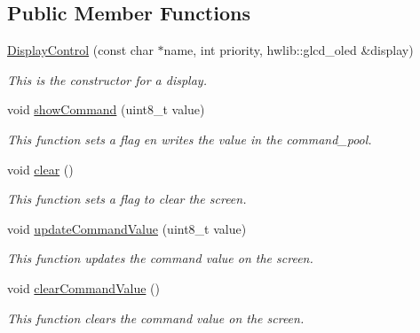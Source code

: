 \subsection*{Public Member Functions}
\begin{DoxyCompactItemize}
\item 
\mbox{\hyperlink{class_display_control_a5a24ccc28d6984bda6871ef6d0e4af3f}{Display\+Control}} (const char $\ast$name, int priority, hwlib\+::glcd\+\_\+oled \&display)
\begin{DoxyCompactList}\small\item\em This is the constructor for a display. \end{DoxyCompactList}\item 
\mbox{\label{class_display_control_a78b3ace358fc199a76e00148115f449d}} 
void \mbox{\hyperlink{class_display_control_a78b3ace358fc199a76e00148115f449d}{show\+Command}} (uint8\+\_\+t value)
\begin{DoxyCompactList}\small\item\em This function sets a flag en writes the value in the command\+\_\+pool. \end{DoxyCompactList}\item 
\mbox{\label{class_display_control_aa231d63d18b09506e0c766999f480579}} 
void \mbox{\hyperlink{class_display_control_aa231d63d18b09506e0c766999f480579}{clear}} ()
\begin{DoxyCompactList}\small\item\em This function sets a flag to clear the screen. \end{DoxyCompactList}\item 
void \mbox{\hyperlink{class_display_control_ae2d8d0f502941d859639fd46ddd8924b}{update\+Command\+Value}} (uint8\+\_\+t value)
\begin{DoxyCompactList}\small\item\em This function updates the command value on the screen. \end{DoxyCompactList}\item 
\mbox{\label{class_display_control_a01207b2034dc3946856496bf2e4d39b6}} 
void \mbox{\hyperlink{class_display_control_a01207b2034dc3946856496bf2e4d39b6}{clear\+Command\+Value}} ()
\begin{DoxyCompactList}\small\item\em This function clears the command value on the screen. \end{DoxyCompactList}\item 

\end{DoxyCompactItemize}
